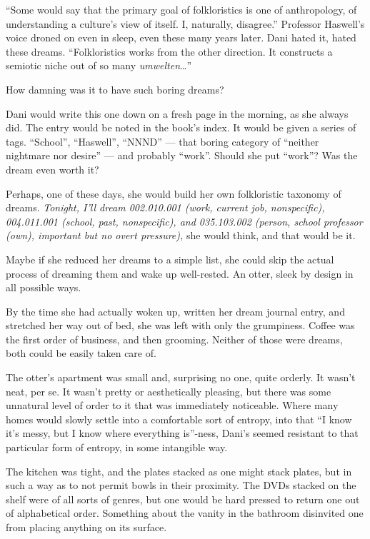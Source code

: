 ``Some would say that the primary goal of folkloristics is one of anthropology, of understanding a culture's view of itself. I, naturally, disagree.'' Professor Haswell's voice droned on even in sleep, even these many years later. Dani hated it, hated these dreams. ``Folkloristics works from the other direction. It constructs a semiotic niche out of so many \emph{umwelten}\ldots{}''

How damning was it to have such boring dreams?

Dani would write this one down on a fresh page in the morning, as she always did. The entry would be noted in the book's index. It would be given a series of tags. ``School'', ``Haswell'', ``NNND'' --- that boring category of ``neither nightmare nor desire'' --- and probably ``work''. Should she put ``work''? Was the dream even worth it?

Perhaps, one of these days, she would build her own folkloristic taxonomy of dreams. \emph{Tonight, I'll dream 002.010.001 (work, current job, nonspecific), 004.011.001 (school, past, nonspecific), and 035.103.002 (person, school professor (own), important but no overt pressure),} she would think, and that would be it.

Maybe if she reduced her dreams to a simple list, she could skip the actual process of dreaming them and wake up well-rested. An otter, sleek by design in all possible ways.

By the time she had actually woken up, written her dream journal entry, and stretched her way out of bed, she was left with only the grumpiness. Coffee was the first order of business, and then grooming. Neither of those were dreams, both could be easily taken care of.

The otter's apartment was small and, surprising no one, quite orderly. It wasn't neat, per se. It wasn't pretty or aesthetically pleasing, but there was some unnatural level of order to it that was immediately noticeable. Where many homes would slowly settle into a comfortable sort of entropy, into that ``I know it's messy, but I know where everything is''-ness, Dani's seemed resistant to that particular form of entropy, in some intangible way.

The kitchen was tight, and the plates stacked as one might stack plates, but in such a way as to not permit bowls in their proximity. The DVDs stacked on the shelf were of all sorts of genres, but one would be hard pressed to return one out of alphabetical order. Something about the vanity in the bathroom disinvited one from placing anything on its surface.

